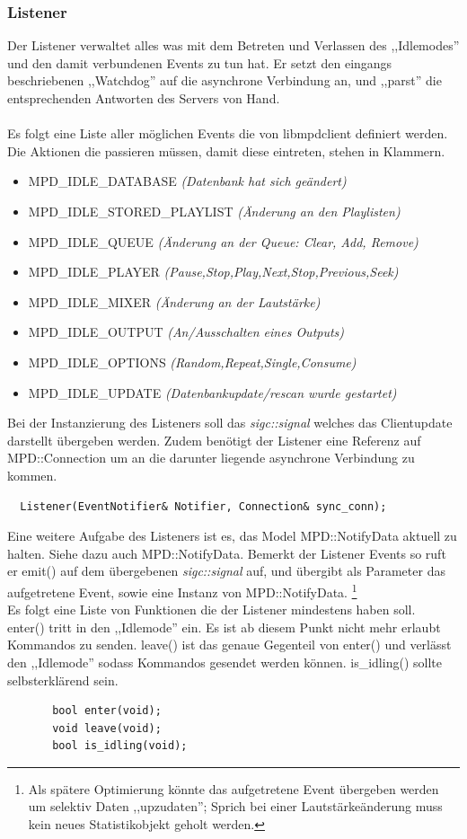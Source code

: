 \subsubsection{Listener}
Der Listener verwaltet alles was mit dem Betreten und Verlassen des ,,Idlemodes'' und den damit verbundenen Events
zu tun hat. Er setzt den eingangs beschriebenen ,,Watchdog'' auf die asynchrone Verbindung an,
und ,,parst'' die entsprechenden Antworten des Servers von Hand. 
\\
\\
Es folgt eine Liste aller möglichen Events die von libmpdclient definiert werden.
Die Aktionen die passieren müssen, damit diese eintreten, stehen in Klammern.
\begin{itemize}
    \item \small MPD\_IDLE\_DATABASE \it(Datenbank hat sich geändert)\rm
    \item \small MPD\_IDLE\_STORED\_PLAYLIST \it(Änderung an den Playlisten)\rm
    \item \small MPD\_IDLE\_QUEUE \it(Änderung an der Queue: Clear, Add, Remove)\rm
    \item \small MPD\_IDLE\_PLAYER \it(Pause,Stop,Play,Next,Stop,Previous,Seek)\rm
    \item \small MPD\_IDLE\_MIXER \it(Änderung an der Lautstärke)\rm
    \item \small MPD\_IDLE\_OUTPUT \it(An/Ausschalten eines Outputs)\rm
    \item \small MPD\_IDLE\_OPTIONS \it(Random,Repeat,Single,Consume)\rm
    \item \small MPD\_IDLE\_UPDATE \it(Datenbankupdate/rescan wurde gestartet)\rm
\end{itemize}
\normalsize
Bei der Instanzierung des Listeners soll das \textit{sigc::signal} welches das Clientupdate darstellt übergeben werden.
Zudem benötigt der Listener eine Referenz auf MPD::Connection um an die darunter liegende asynchrone Verbindung zu kommen.  
\begin{verbatim}
  Listener(EventNotifier& Notifier, Connection& sync_conn);
\end{verbatim}

Eine weitere Aufgabe des Listeners ist es, das Model MPD::NotifyData aktuell zu halten. Siehe dazu auch MPD::NotifyData.
Bemerkt der Listener Events so ruft er emit() auf dem übergebenen \textit{sigc::signal} auf,
und übergibt als Parameter das aufgetretene Event, sowie eine Instanz von MPD::NotifyData.
\footnote{Als spätere Optimierung könnte das aufgetretene Event übergeben werden um selektiv Daten ,,upzudaten''; Sprich bei einer Lautstärkeänderung muss kein neues Statistikobjekt geholt werden.}
\\
Es folgt eine Liste von Funktionen die der Listener mindestens haben soll.
\\
enter() tritt in den ,,Idlemode'' ein. Es ist ab diesem Punkt nicht mehr erlaubt Kommandos zu senden.
leave() ist das genaue Gegenteil von enter() und verlässt den ,,Idlemode'' sodass Kommandos gesendet werden können.  
is\_idling() sollte selbsterklärend sein.
\begin{verbatim}
       bool enter(void);
       void leave(void);
       bool is_idling(void);
\end{verbatim}

